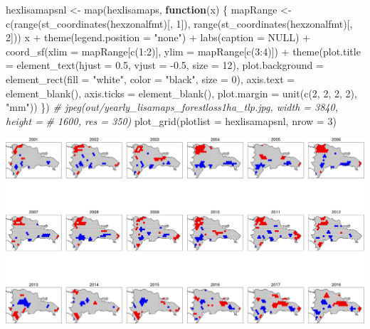 \documentclass[10pt,landscape,a3paper]{article}
\newenvironment{Shaded}{\begin{snugshade}}{\end{snugshade}}
\newcommand{\AttributeTok}[1]{\textcolor[rgb]{0.77,0.63,0.00}{#1}}
\newcommand{\CommentTok}[1]{\textcolor[rgb]{0.56,0.35,0.01}{\textit{#1}}}
\newcommand{\ConstantTok}[1]{\textcolor[rgb]{0.00,0.00,0.00}{#1}}
\newcommand{\ControlFlowTok}[1]{\textcolor[rgb]{0.13,0.29,0.53}{\textbf{#1}}}
\newcommand{\DecValTok}[1]{\textcolor[rgb]{0.00,0.00,0.81}{#1}}
\newcommand{\FloatTok}[1]{\textcolor[rgb]{0.00,0.00,0.81}{#1}}
\newcommand{\FunctionTok}[1]{\textcolor[rgb]{0.00,0.00,0.00}{#1}}
\newcommand{\NormalTok}[1]{#1}
\newcommand{\OtherTok}[1]{\textcolor[rgb]{0.56,0.35,0.01}{#1}}
\newcommand{\SpecialCharTok}[1]{\textcolor[rgb]{0.00,0.00,0.00}{#1}}
\newcommand{\StringTok}[1]{\textcolor[rgb]{0.31,0.60,0.02}{#1}}
\begin{document}
\begin{Shaded}
\begin{Highlighting}[]
\NormalTok{hexlisamapsnl }\OtherTok{\textless{}{-}} \FunctionTok{map}\NormalTok{(hexlisamaps, }\ControlFlowTok{function}\NormalTok{(x) \{}
\NormalTok{    mapRange }\OtherTok{\textless{}{-}} \FunctionTok{c}\NormalTok{(}\FunctionTok{range}\NormalTok{(}\FunctionTok{st\_coordinates}\NormalTok{(hexzonalfmt)[, }\DecValTok{1}\NormalTok{]), }\FunctionTok{range}\NormalTok{(}\FunctionTok{st\_coordinates}\NormalTok{(hexzonalfmt)[,}
        \DecValTok{2}\NormalTok{]))}
\NormalTok{    x }\SpecialCharTok{+} \FunctionTok{theme}\NormalTok{(}\AttributeTok{legend.position =} \StringTok{"none"}\NormalTok{) }\SpecialCharTok{+} \FunctionTok{labs}\NormalTok{(}\AttributeTok{caption =} \ConstantTok{NULL}\NormalTok{) }\SpecialCharTok{+} \FunctionTok{coord\_sf}\NormalTok{(}\AttributeTok{xlim =}\NormalTok{ mapRange[}\FunctionTok{c}\NormalTok{(}\DecValTok{1}\SpecialCharTok{:}\DecValTok{2}\NormalTok{)],}
        \AttributeTok{ylim =}\NormalTok{ mapRange[}\FunctionTok{c}\NormalTok{(}\DecValTok{3}\SpecialCharTok{:}\DecValTok{4}\NormalTok{)]) }\SpecialCharTok{+} \FunctionTok{theme}\NormalTok{(}\AttributeTok{plot.title =} \FunctionTok{element\_text}\NormalTok{(}\AttributeTok{hjust =} \FloatTok{0.5}\NormalTok{, }\AttributeTok{vjust =} \SpecialCharTok{{-}}\FloatTok{0.5}\NormalTok{,}
        \AttributeTok{size =} \DecValTok{12}\NormalTok{), }\AttributeTok{plot.background =} \FunctionTok{element\_rect}\NormalTok{(}\AttributeTok{fill =} \StringTok{"white"}\NormalTok{, }\AttributeTok{color =} \StringTok{"black"}\NormalTok{,}
        \AttributeTok{size =} \DecValTok{0}\NormalTok{), }\AttributeTok{axis.text =} \FunctionTok{element\_blank}\NormalTok{(), }\AttributeTok{axis.ticks =} \FunctionTok{element\_blank}\NormalTok{(), }\AttributeTok{plot.margin =} \FunctionTok{unit}\NormalTok{(}\FunctionTok{c}\NormalTok{(}\DecValTok{2}\NormalTok{,}
        \DecValTok{2}\NormalTok{, }\DecValTok{2}\NormalTok{, }\DecValTok{2}\NormalTok{), }\StringTok{"mm"}\NormalTok{))}
\NormalTok{\})}
\CommentTok{\# jpeg(\textquotesingle{}out/yearly\_lisamaps\_forestloss1ha\_tlp.jpg\textquotesingle{}, width = 3840, height =}
\CommentTok{\# 1600, res = 350)}
\FunctionTok{plot\_grid}\NormalTok{(}\AttributeTok{plotlist =}\NormalTok{ hexlisamapsnl, }\AttributeTok{nrow =} \DecValTok{3}\NormalTok{)}
\end{Highlighting}
\end{Shaded}

\begin{center}\includegraphics{img/modelling/aa-lisa-maps-1} \end{center}
\end{document}
